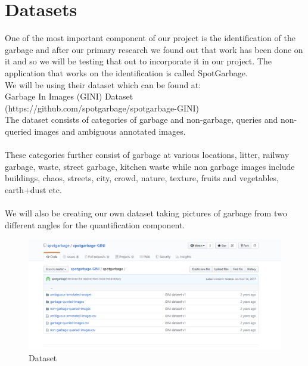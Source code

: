 \newpage
\section{Datasets}
One of the most important component of our project is the identification of the garbage and after our primary research we found out that work has been done on it and so we will be testing that out to incorporate it in our project. The application that works on the identification is called SpotGarbage.\\
We will be using their dataset which can be found at:\\
Garbage In Images (GINI) Dataset (https://github.com/spotgarbage/spotgarbage-GINI)\\
The dataset consists of categories of garbage and non-garbage, queries and non-queried images and  ambiguous annotated images. \\
\\
These categories further consist of garbage at various locations, litter, railway garbage, waste, street garbage, kitchen waste while non garbage images include buildings, chaos, streets, city, crowd, nature, texture, fruits and vegetables, earth+dust etc.\\
\\
We will also be creating our own dataset taking pictures of garbage from two different angles for the quantification component.

\begin{figure}[!hb]
   \centering

   \includegraphics[scale=0.7]{images/Dataset.PNG}

 
   \caption{Dataset}\label{fig:picture}
\end{figure}
\newpage
